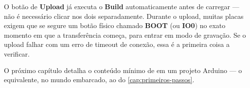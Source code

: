 \begin{dica}
O botão de \textbf{Upload} já executa o \textbf{Build} automaticamente antes de carregar — não é necessário clicar nos dois separadamente. Durante o upload, muitas placas exigem que se segure um botão físico chamado \textbf{BOOT} (ou \textbf{IO0}) no exato momento em que a transferência começa, para entrar em modo de gravação. Se o upload falhar com um erro de timeout de conexão, essa é a primeira coisa a verificar.
\end{dica}

O próximo capítulo detalha o conteúdo mínimo de  em um projeto Arduino — o equivalente, no mundo embarcado, ao  do \cref{cap:primeiros-passos}.

